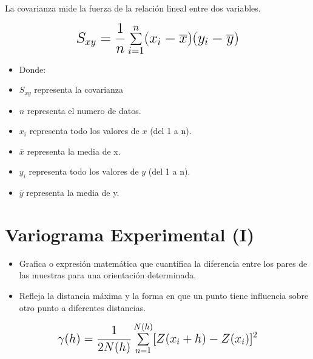 \documentclass[]{article}
\providecommand{\tightlist}{%
  \setlength{\itemsep}{0pt}\setlength{\parskip}{0pt}}
\begin{document}
La covarianza mide la fuerza de la relación lineal entre dos variables.

\[
\LARGE
\begin{aligned}
S_{xy} = \frac{1}{n}\sum_{i=1}^{n}(x_i-\overline{x})(y_i-\overline{y})
\end{aligned}
\]

\begin{itemize}
\tightlist
\item
  Donde:
\item
  \(S_{xy}\) representa la covarianza
\item
  \(n\) representa el numero de datos.
\item
  \(x_i\) representa todo los valores de \(x\) (del 1 a n).
\item
  \(\overline{x}\) representa la media de x.
\item
  \(y_i\) representa todo los valores de \(y\) (del 1 a n).
\item
  \(\overline{y}\) representa la media de y.
\end{itemize}

\section{Variograma Experimental (I)}\label{variograma-experimental-i}

\begin{itemize}
\item
  Grafica o expresión matemática que cuantifica la diferencia entre los
  pares de las muestras para una orientación determinada.
\item
  Refleja la distancia máxima y la forma en que un punto tiene
  influencia sobre otro punto a diferentes distancias.
\end{itemize}

\[
\Large
\begin{aligned}
\gamma (h) = \frac{1}{2N(h)}\sum_{n=1}^{N(h)}[Z(x_i + h)-Z(x_i )]^{2}
\end{aligned}
\]
\end{document}
